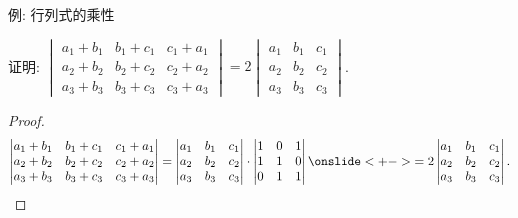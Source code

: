 \begin{frame}{例: 行列式的乘性}
	\onslide<+->
	\begin{example}
		证明:
		$\begin{vmatrix}
			a_1+b_1&b_1+c_1&c_1+a_1\\
			a_2+b_2&b_2+c_2&c_2+a_2\\
			a_3+b_3&b_3+c_3&c_3+a_3
		\end{vmatrix}=2\begin{vmatrix}
			a_1&b_1&c_1\\
			a_2&b_2&c_2\\
			a_3&b_3&c_3
		\end{vmatrix}$.
	\end{example}
	\onslide<+->
	\begin{proof}
		\[\begin{vmatrix}
			a_1+b_1&b_1+c_1&c_1+a_1\\
			a_2+b_2&b_2+c_2&c_2+a_2\\
			a_3+b_3&b_3+c_3&c_3+a_3
		\end{vmatrix}=\begin{vmatrix}
			a_1&b_1&c_1\\
			a_2&b_2&c_2\\
			a_3&b_3&c_3
		\end{vmatrix}\cdot\begin{vmatrix}
			1&0&1\\
			1&1&0\\
			0&1&1
		\end{vmatrix}\onslide<+->{=2\begin{vmatrix}
			a_1&b_1&c_1\\
			a_2&b_2&c_2\\
			a_3&b_3&c_3
		\end{vmatrix}.}\qedhere\]
	\end{proof}
\end{frame}


